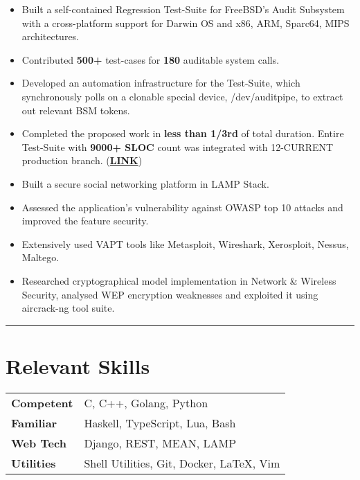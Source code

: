 \documentclass[10pt, margin=0.5in]{deedy-resume-openfont}
\begin{document}
\begin{minipage}[t]{0.48\textwidth}
\vspace{5pt}
\begin{itemize}[leftmargin=*, noitemsep]
\item Built a self-contained Regression Test-Suite for FreeBSD's Audit Subsystem with a cross-platform support for Darwin OS and x86, ARM, Sparc64, MIPS architectures.
  \item Contributed \textbf{500+} test-cases for \textbf{180} auditable system calls.
  \item Developed an automation infrastructure for the Test-Suite, which synchronously polls on a clonable special device, /dev/auditpipe, to extract out relevant BSM tokens.
  \item	Completed the proposed work in \textbf{less than 1/3rd} of total duration. Entire Test-Suite with \textbf{9000+ SLOC} count was integrated with 12-CURRENT production branch. (\href{https://github.com/freebsd/freebsd/tree/master/tests/sys/audit}{\textbf{LINK}})
\end{itemize}


\vspace{5pt}
\begin{itemize}[leftmargin=*, noitemsep]
  \item Built a secure social networking platform in LAMP Stack.
  \item Assessed the application's vulnerability against OWASP top 10 attacks and improved the feature security.
  \item Extensively used VAPT tools like Metasploit, Wireshark, Xerosploit, Nessus, Maltego.
  \item	Researched cryptographical model implementation in Network \& Wireless Security, analysed WEP encryption weaknesses and exploited it using aircrack-ng tool suite.
\end{itemize}


\vspace{-2pt}				%
\rule{\textwidth}{0.5pt}	%
\vspace{-14pt}				%

%
%
\section{Relevant Skills}
\vspace{0pt}
\begin{tabular}{ll}
 \textbf{Competent}  & C, C++, Golang, Python\\
 \textbf{Familiar}   & Haskell, TypeScript, Lua, Bash \\
 \textbf{Web Tech}   & Django, REST, MEAN, LAMP \\
 \textbf{Utilities}  & Shell Utilities, Git, Docker, \LaTeX, Vim
\end{tabular}



\end{minipage}
\end{document}
